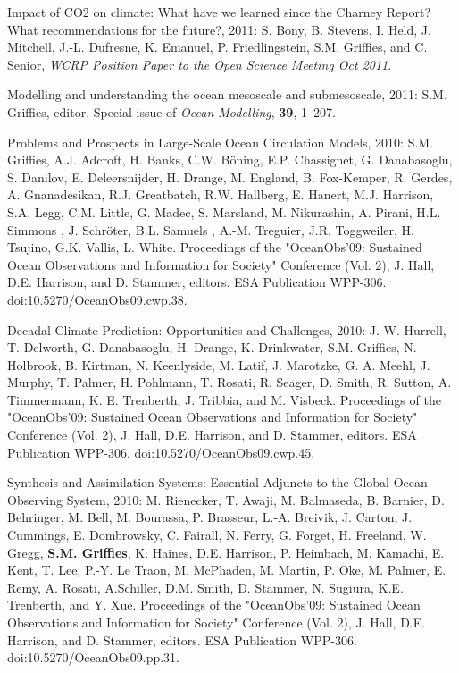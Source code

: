 \begin{etaremune}
\item Impact of CO2 on climate: What have we learned since the Charney
  Report?  What recommendations for the future?, 2011: S. Bony,
  B. Stevens, I. Held, J. Mitchell, J.-L. Dufresne, K. Emanuel,
  P. Friedlingstein, S.M. Grif\/f\/ies, and C. Senior, {\it WCRP
    Position Paper to the Open Science Meeting Oct 2011}.

\item Modelling and understanding the ocean mesoscale and
  submesoscale, 2011: S.M. Grif\/f\/ies, editor. Special issue of
  {\it Ocean Modelling}, {\bf 39}, 1--207.

\item Problems and Prospects in Large-Scale Ocean Circulation Models,
  2010: S.M. Grif\/f\/ies, A.J. Adcroft, H. Banks, C.W. B\"oning,
 E.P. Chassignet, G. Danabasoglu, S.  Danilov, E. Deleersnijder,
  H. Drange, M. England, B. Fox-Kemper, R. Gerdes, A.  Gnanadesikan,
  R.J. Greatbatch, R.W. Hallberg, E. Hanert, M.J. Harrison, S.A. Legg,
  C.M.  Little, G. Madec, S. Marsland, M. Nikurashin, A. Pirani,
  H.L. Simmons , J. Schr\"oter, B.L.  Samuels , A.-M. Treguier,
  J.R. Toggweiler, H. Tsujino, G.K. Vallis, L. White.  Proceedings of
  the "OceanObs’09: Sustained Ocean Observations and Information for
  Society" Conference (Vol. 2), J. Hall, D.E. Harrison, and
  D. Stammer, editors. ESA Publication WPP-306.
  doi:10.5270/OceanObs09.cwp.38.

\item Decadal Climate Prediction: Opportunities and Challenges, 2010:
  J. W. Hurrell, T. Delworth, G. Danabasoglu, H. Drange,
  K. Drinkwater, S.M. Grif\/f\/ies, N. Holbrook, B. Kirtman,
  N. Keenlyside, M. Latif, J. Marotzke, G. A. Meehl, J. Murphy,
  T. Palmer, H. Pohlmann, T. Rosati, R. Seager, D. Smith, R. Sutton,
  A. Timmermann, K. E. Trenberth, J. Tribbia, and M. Visbeck.
  Proceedings of the "OceanObs’09: Sustained Ocean Observations and
  Information for Society" Conference (Vol. 2), J. Hall,
  D.E. Harrison, and D. Stammer, editors. ESA Publication WPP-306.
  doi:10.5270/OceanObs09.cwp.45.

\item Synthesis and Assimilation Systems: Essential Adjuncts to the
  Global Ocean Observing System, 2010: M. Rienecker, T. Awaji,
  M. Balmaseda, B. Barnier, D. Behringer, M. Bell, M. Bourassa,
  P. Brasseur, L.-A. Breivik, J. Carton, J. Cummings, E. Dombrowsky,
  C. Fairall, N. Ferry, G. Forget, H. Freeland, W. Gregg, {\bf
    S.M. Grif\/f\/ies}, K. Haines, D.E. Harrison, P. Heimbach,
  M. Kamachi, E. Kent, T. Lee, P.-Y. {Le Traon}, M. McPhaden,
  M. Martin, P. Oke, M. Palmer, E. Remy, A. Rosati, A.Schiller,
  D.M. Smith, D. Stammer, N. Sugiura, K.E. Trenberth, and Y. Xue.
  Proceedings of the "OceanObs’09: Sustained Ocean Observations and
  Information for Society" Conference (Vol. 2), J. Hall,
  D.E. Harrison, and D. Stammer, editors. ESA Publication WPP-306.
  doi:10.5270/OceanObs09.pp.31.


\end{etaremune}
